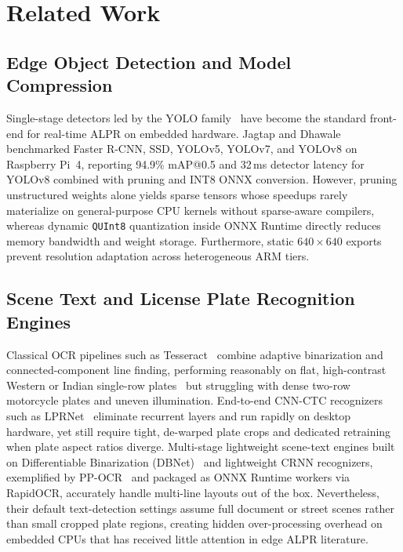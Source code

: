 \documentclass[pdflatex,sn-mathphys-num]{sn-jnl}
\begin{document}
\section{Related Work}\label{sec:related}

\subsection{Edge Object Detection and Model Compression}
Single-stage detectors led by the YOLO family~\cite{jocher2023yolov8} have become the standard front-end for real-time ALPR on embedded hardware. Jagtap and Dhawale~\cite{jagtap2025yolo} benchmarked Faster R-CNN, SSD, YOLOv5, YOLOv7, and YOLOv8 on Raspberry Pi~4, reporting 94.9\% mAP@0.5 and 32\,ms detector latency for YOLOv8 combined with pruning and INT8 ONNX conversion. However, pruning unstructured weights alone yields sparse tensors whose speedups rarely materialize on general-purpose CPU kernels without sparse-aware compilers, whereas dynamic \texttt{QUInt8} quantization inside ONNX Runtime directly reduces memory bandwidth and weight storage. Furthermore, static $640\times 640$ exports prevent resolution adaptation across heterogeneous ARM tiers.

\subsection{Scene Text and License Plate Recognition Engines}
Classical OCR pipelines such as Tesseract~\cite{smith2007tesseract} combine adaptive binarization and connected-component line finding, performing reasonably on flat, high-contrast Western or Indian single-row plates~\cite{jagtap2025yolo} but struggling with dense two-row motorcycle plates and uneven illumination. End-to-end CNN-CTC recognizers such as LPRNet~\cite{zherzdev2018lprnet} eliminate recurrent layers and run rapidly on desktop hardware, yet still require tight, de-warped plate crops and dedicated retraining when plate aspect ratios diverge. Multi-stage lightweight scene-text engines built on Differentiable Binarization (DBNet)~\cite{liao2020real} and lightweight CRNN recognizers, exemplified by PP-OCR~\cite{li2022ppocrv3} and packaged as ONNX Runtime workers via RapidOCR, accurately handle multi-line layouts out of the box. Nevertheless, their default text-detection settings assume full document or street scenes rather than small cropped plate regions, creating hidden over-processing overhead on embedded CPUs that has received little attention in edge ALPR literature.
\end{document}

